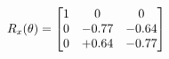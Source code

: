 \documentclass[preview]{standalone}
\begin{document}
\begin{align*}
\special{dvisvgm:raw <g id='unique000'>}R_{x}(\theta) = \begin{bmatrix}1 & 0 & 0 \\0 & -0.77 & -0.64 \\0 & +0.64 & -0.77\end{bmatrix}\special{dvisvgm:raw </g>}
\end{align*}
\end{document}
